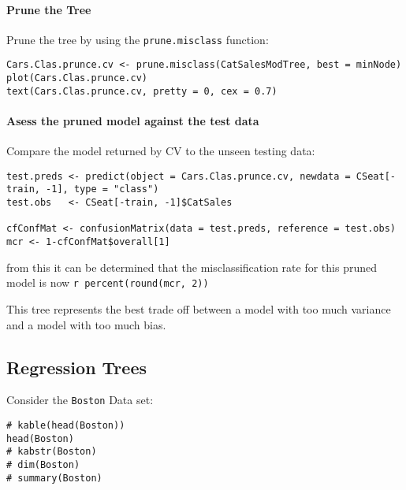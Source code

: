 \documentclass[12pt]{article}
\newcommand{\passthrough}[1]{#1}
\begin{document}
\hypertarget{prune-the-tree}{%
\paragraph{Prune the Tree}\label{prune-the-tree}}

Prune the tree by using the \passthrough{\lstinline!prune.misclass!}
function:

\begin{lstlisting}
Cars.Clas.prunce.cv <- prune.misclass(CatSalesModTree, best = minNode)
plot(Cars.Clas.prunce.cv)
text(Cars.Clas.prunce.cv, pretty = 0, cex = 0.7)
\end{lstlisting}

\hypertarget{asess-the-pruned-model-against-the-test-data}{%
\paragraph{Asess the pruned model against the test
data}\label{asess-the-pruned-model-against-the-test-data}}

Compare the model returned by CV to the unseen testing data:

\begin{lstlisting}
test.preds <- predict(object = Cars.Clas.prunce.cv, newdata = CSeat[-train, -1], type = "class")
test.obs   <- CSeat[-train, -1]$CatSales

cfConfMat <- confusionMatrix(data = test.preds, reference = test.obs)
mcr <- 1-cfConfMat$overall[1]
\end{lstlisting}

from this it can be determined that the misclassification rate for this
pruned model is now \passthrough{\lstinline!r percent(round(mcr, 2))!}

This tree represents the best trade off between a model with too much
variance and a model with too much bias.

\hypertarget{regression-trees}{%
\subsection{Regression Trees}\label{regression-trees}}

Consider the \passthrough{\lstinline!Boston!} Data set:

\begin{lstlisting}
# kable(head(Boston))
head(Boston)
# kabstr(Boston)
# dim(Boston)
# summary(Boston)



\end{lstlisting}
\end{document}
